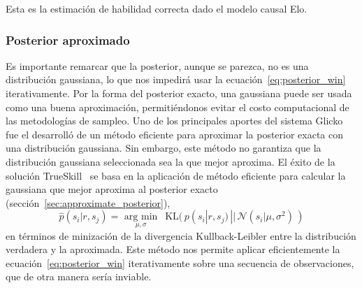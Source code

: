 \documentclass[a4paper,11pt]{book}
\newcommand{\N}{\mathcal{N}}
\theoremstyle{definition}
\begin{document}


Esta es la estimación de habilidad correcta dado el modelo causal Elo.

\subsubsection{Posterior aproximado}

Es importante remarcar que la posterior, aunque se parezca, no es una distribución gaussiana, lo que nos impedirá usar la ecuación~\eqref{eq:posterior_win} iterativamente.
%
Por la forma del posterior exacto, una gaussiana puede ser usada como una buena aproximación, permitiéndonos evitar el costo computacional de las metodologías de sampleo.
%
Uno de los principales aportes del sistema Glicko~\cite{Glikman2013} fue el desarrolló de un método eficiente para aproximar la posterior exacta con una distribución gaussiana.
%
Sin embargo, este método no garantiza que la distribución gaussiana seleccionada sea la que mejor aproxima.
%
El éxito de la solución TrueSkill~\cite{Herbrich2007} se basa en la aplicación de método eficiente para calcular la gaussiana que mejor aproxima al posterior exacto (sección~\ref{sec:approximate_posterior}),
%
\begin{equation} \label{eq:approx}
 \widehat{p}(s_i| r, s_j) = \underset{\mu, \sigma}{\text{ arg min }} \ \ \text{KL}(\, p(s_i| r, s_j) \, || \,  \N(s_i|\mu, \sigma^2) \, )
\end{equation}
%
en términos de minización de la divergencia Kullback-Leibler entre la distribución verdadera y la aproximada.
%
Este método nos permite aplicar eficientemente la ecuación~\eqref{eq:posterior_win} iterativamente sobre una secuencia de observaciones, que de otra manera sería inviable.

\end{document}
